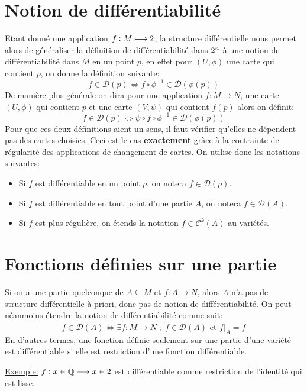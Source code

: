    \section{Notion de différentiabilité}
   Etant donné une application \( f : M \longmapsto 2 \), la structure différentielle nous permet alors de généraliser la définition de différentiabilité dans \( 2^n \) à une notion de différentiabilité dans \( M \) en un point \( p \), en effet pour \( (U, \phi) \) une carte qui contient \( p \), on donne la définition suivante:
   \[ 
      f \in \mathcal{D}(p) \iff f \circ \phi^{-1} \in \mathcal{D}( \phi(p))
   \]
   De manière plus générale on dira pour une application \( f : M \longmapsto N \), une carte \( (U, \phi) \) qui contient \( p \) et une carte \( (V, \psi) \) qui contient \( f(p) \) alors on définit:
   \[ 
      f \in \mathcal{D}(p) \iff \psi  \circ f \circ \phi^{-1} \in \mathcal{D}(\phi(p))
   \]
   Pour que ces deux définitions aient un sens, il faut vérifier qu'elles ne dépendent pas des cartes choisies. Ceci est le cas \textbf{exactement} gràce à la contrainte de régularité des applications de changement de cartes. On utilise donc les notations suivantes:
   \begin{itemize}
      \item  Si \( f \) est différentiable en un point \( p \), on notera \( f \in \mathcal{D}(p)\).
      \item  Si \( f \) est différentiable en tout point d'une partie \( A \), on notera \( f \in \mathcal{D}(A)\).
      \item  Si \( f \) est plus régulière, on étends la notation \( f \in \mathcal{C}^k(A) \) au variétés.
   \end{itemize}
   \section{Fonctions définies sur une partie}
   Si on a une partie quelconque de \( A \subseteq M \) et \( f : A \longrightarrow N \), alors \( A \) n'a pas de structure différentielle à priori, donc pas de notion de différentiabilité. On peut néanmoins étendre la notion de différentiabilité comme suit:
   \[ 
      f \in \mathcal{D}(A) \iff \exists \widetilde{f} : M \longrightarrow N \; ; \; \widetilde{f} \in \mathcal{D}(A) \text{ et } \widetilde{f}\big|_A = f
   \]
   En d'autres termes, une fonction définie seulement sur une partie d'une variété est différentiable si elle est restriction d'une fonction différentiable.\<
   
   \uline{Exemple:} \( f : x \in \mathbb{Q} \longmapsto x \in 2 \) est différentiable comme restriction de l'identité qui est lisse.
